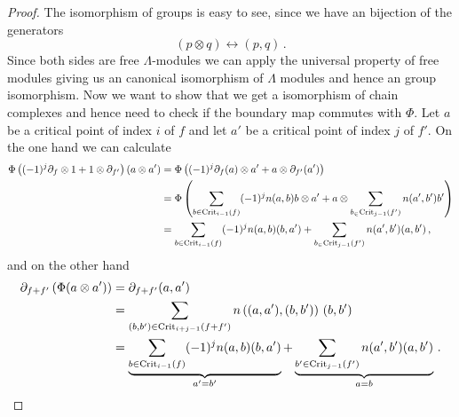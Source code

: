 	\begin{proof}
		The isomorphism of groups is easy to see, since we have an bijection of the generators
		\begin{equation*}
			(p\otimes q) \leftrightarrow (p,q)\,.
		\end{equation*} Since both sides are free $\Lambda$-modules we can apply the universal property of free modules giving us an canonical isomorphism of $\Lambda$ modules and hence an group isomorphism.
		Now we want to show that we get a isomorphism of chain complexes and hence need to check if the boundary map commutes with $\Phi$. Let $a$ be a critical point of index $i$ of $f$ and let $a'$ be a critical point of index $j$ of $f'$. On the one hand we can calculate
		\begin{align*}
			\Phi \left((-1)^j\partial_f\otimes 1 +1\otimes \partial_{f'}\right)(a\otimes a')
			&= \Phi \left((-1)^j\partial_f(a) \otimes a' +a\otimes  \partial_{f'}(a')\right)\\
			&= \Phi \left(\sum_{b\in \mathrm{Crit}_{i-1}(f)}(-1)^jn(a,b)b\otimes a' +a\otimes \sum_{b_\in \mathrm{Crit}_{j-1}(f')}n(a',b')b'\right) \\
			&=\sum_{b\in \mathrm{Crit}_{i-1}(f)}(-1)^j n(a,b)(b, a') +\sum_{b_\in \mathrm{Crit}_{j-1}(f')}n(a',b')(a,b')\,,
		\end{align*} and on the other hand
		\begin{align*}
			\partial_{f+f'}\left(\Phi(a \otimes a')\right)
			&=\partial_{f+f'}(a,a')\\
			&=\sum_{(b,b')\in \mathrm{Crit}_{i+j-1}(f+f')}n\left((a,a'),(b,b')\right)\,(b,b')\\
			&=\underbrace{\sum_{b\in \mathrm{Crit}_{i-1}(f)}(-1)^j n(a,b)(b,a')}_{a'=b'}+
			\underbrace{\sum_{b'\in \mathrm{Crit}_{j-1}(f')}n(a',b')(a,b')}_{a=b}\,.
		\end{align*}
		
	\end{proof}
	
